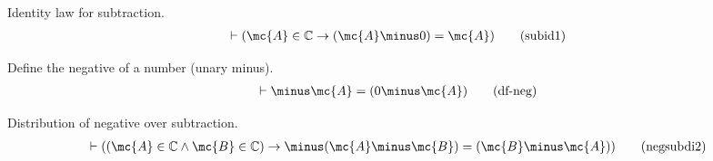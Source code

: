\begin{lemma} Identity law for subtraction.  
\begin{align}
\vdash ( \mc{A} \in \mathbb{C} \rightarrow ( \mc{A} \minus 0 ) = \mc{A}
    )\label{eq:subid1}\tag{subid1}
\end{align}
\end{lemma}


\begin{metadefinition} Define the negative of a number (unary
minus).  
\begin{align}
\vdash \minus\mc{A} = ( 0 \minus \mc{A} )\label{eq:df-neg}\tag{df-neg}
\end{align}
\end{metadefinition}


\begin{lemma} Distribution of negative over
subtraction.  
\begin{align}
\vdash ( ( \mc{A} \in \mathbb{C} \wedge \mc{B} \in \mathbb{C} ) \rightarrow
    \minus ( \mc{A} \minus \mc{B} ) = ( \mc{B} \minus \mc{A} )
    )\label{eq:negsubdi2}\tag{negsubdi2}
\end{align}
\end{lemma}


